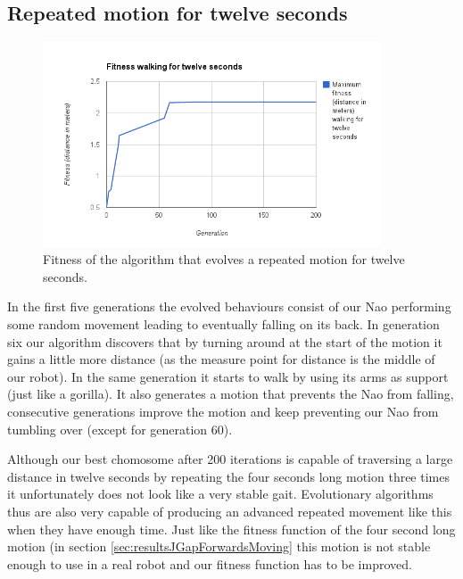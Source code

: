 \documentclass[a4paper,10pt]{article}
\begin{document}
\subsection{Repeated motion for twelve seconds}
\label{sec:resultsJGapForwardsMovingTwelveSeconds}
\begin{figure}[h!]
\includegraphics[width=100mm]{images/walkingtwelve}
\caption{Fitness of the algorithm that evolves a repeated motion for twelve seconds.}
\label{fig:walkingLongFitness}
\end{figure}


In the first five generations the evolved behaviours consist of our Nao performing some random movement leading to eventually falling on its back. In generation six our algorithm discovers that by turning around at the start of the motion it gains a little more distance (as the measure point for distance is the middle of our robot). In the same generation it starts to walk by using its arms as support (just like a gorilla). It also generates a motion that prevents the Nao from falling, consecutive generations improve the motion and keep preventing our Nao from tumbling over (except for generation 60).

Although our best chomosome after 200 iterations is capable of traversing a large distance in twelve seconds by repeating the four seconds long motion three times it unfortunately does not look like a very stable gait. Evolutionary algorithms thus are also very capable of producing an advanced repeated movement like this when they have enough time. Just like the fitness function of the four second long motion (in section \ref{sec:resultsJGapForwardsMoving} this motion is not stable enough to use in a real robot and our fitness function has to be improved. 
\end{document}
